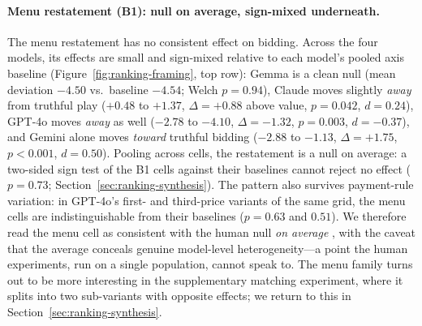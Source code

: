 \paragraph{Menu restatement (B1): null on average, sign-mixed underneath.}
The menu restatement has no consistent effect on bidding. Across the four
models, its effects are small and sign-mixed relative to each model's pooled
axis baseline (Figure~\ref{fig:ranking-framing}, top row): Gemma is a clean
null (mean deviation $-4.50$ vs.\ baseline $-4.54$; Welch $p = 0.94$), Claude
moves slightly \emph{away} from truthful play ($+0.48$ to $+1.37$,
$\Delta = +0.88$ above value, $p = 0.042$, $d = 0.24$), GPT-4o moves
\emph{away} as well ($-2.78$ to $-4.10$, $\Delta = -1.32$, $p = 0.003$,
$d = -0.37$), and Gemini alone moves \emph{toward} truthful bidding ($-2.88$
to $-1.13$, $\Delta = +1.75$, $p < 0.001$, $d = 0.50$). Pooling across cells,
the restatement is a null on average: a two-sided sign test of the B1 cells
against their baselines cannot reject no effect ($p = 0.73$;
Section~\ref{sec:ranking-synthesis}). The pattern also survives payment-rule
variation: in GPT-4o's first- and third-price variants of the same grid, the
menu cells are indistinguishable from their baselines ($p = 0.63$ and
$0.51$). We therefore read the menu cell as consistent with the human
null \emph{on average} \citep{gonczarowski2023strategyproofness,
gonczarowski2024describing}, with the caveat that the average conceals
genuine model-level heterogeneity---a point the human experiments, run on a
single population, cannot speak to. The menu family turns out to be more
interesting in the supplementary matching experiment, where it splits into two
sub-variants with opposite effects; we return to this in
Section~\ref{sec:ranking-synthesis}.

